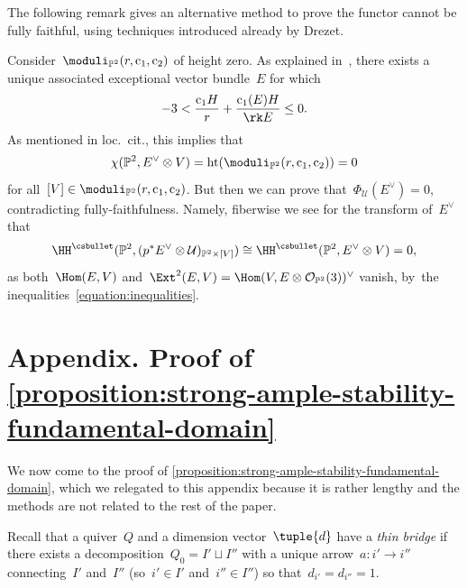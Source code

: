 The following remark gives an alternative method to prove
the functor cannot be fully faithful,
using techniques introduced already by Drezet.
\begin{remark}
\label{remark:associated-exceptional-bundle}
Consider~$\moduli_{\mathbb{P}^2}(r,\mathrm{c}_1,\mathrm{c}_2)$ of height zero.
As explained in~\cite[\S5.1]{MR0916199},
there exists a unique associated exceptional vector bundle~$E$
for which
\begin{equation}
\label{equation:inequalities}
-3<\frac{\mathrm{c}_1H}{r}+\frac{\mathrm{c}_1(E)H}{\rk E}\leq 0.
\end{equation}
As mentioned in loc.~cit.,
this implies that
\begin{equation*}
\chi(\mathbb{P}^2,E^\vee\otimes V)=\operatorname{ht}(\moduli_{\mathbb{P}^2}(r,\mathrm{c}_1,\mathrm{c}_2))=0
\end{equation*}
for all~$[V]\in\moduli_{\mathbb{P}^2}(r,\mathrm{c}_1,\mathrm{c}_2)$.
But then we can prove that~$\Phi_{\mathcal{U}}(E^\vee)=0$,
contradicting fully-faithfulness.
Namely, fiberwise we see for the transform of~$E^\vee$ that
\begin{equation*}
\HH^\csbullet(\mathbb{P}^2,(p^*E^\vee\otimes\mathcal{U})_{\mathbb{P}^2\times[V]})
\cong
\HH^\csbullet(\mathbb{P}^2,E^\vee\otimes V)
=
0,
\end{equation*}
as both~$\Hom(E,V)$ and~$\Ext^2(E,V)=\Hom(V,E\otimes\mathcal{O}_{\mathbb{P}^2}(3))^\vee$ vanish, by~the inequalities~\eqref{equation:inequalities}.
\end{remark}

\appendix

\section*{Appendix. Proof of \texorpdfstring{\cref{proposition:strong-ample-stability-fundamental-domain}}{Proposition \ref{proposition:strong-ample-stability-fundamental-domain}}}
\label{section:proof-no-thin-bridges}
We now come to the proof of \cref{proposition:strong-ample-stability-fundamental-domain},
which we relegated to this appendix because it is rather lengthy
and the methods are not related to the rest of the paper.

Recall that a quiver~$Q$ and a dimension vector~$\tuple{d}$
have a \emph{thin bridge}
if there exists a decomposition~$Q_0=I'\sqcup I''$
with a unique arrow~$a\colon i'\to i''$ connecting~$I'$ and~$I''$
(so~$i'\in I'$ and~$i''\in I''$)
so that~$d_{i'}=d_{i''}=1$.


